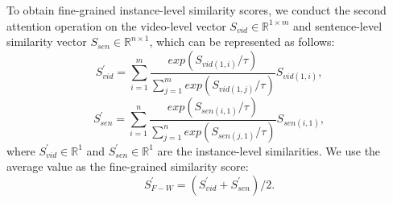 \documentclass[sigconf]{acmart}
\begin{document}
To obtain fine-grained instance-level similarity scores, we conduct the second attention operation on the video-level vector $S_{vid} \in \mathbb{R}^{1 \times m}$ and sentence-level similarity vector $S_{sen} \in \mathbb{R}^{n \times 1}$, which can be represented as follows: 
\begin{equation}
    S^{\prime}_{vid}=\sum _{i=1} ^m \frac{exp(S_{vid (1,i)}/\tau) }{\sum _{j=1} ^m exp(S_{vid (1,j)}/\tau)} S_{vid (1,i)}, 
\label{eq:attention_video2}
\end{equation}
\begin{equation}
    S^{\prime}_{sen}=\sum _{i=1} ^n \frac{exp(S_{sen (i,1)}/\tau) }{\sum _{j=1} ^n exp(S_{sen (j,1)}/\tau)} S_{sen (i,1)},
\label{eq:attention_sentence2}
\end{equation}
where $S^{\prime}_{vid} \in \mathbb{R}^1$ and $S^{\prime}_{sen} \in \mathbb{R}^1$ are the instance-level similarities. We use the average value as the fine-grained similarity score:
\begin{equation}
    S^{\prime}_{F-W}=(S^{\prime}_{vid}+S^{\prime}_{sen})/2.
\label{eq:final_simi}
\end{equation}
\end{document}
